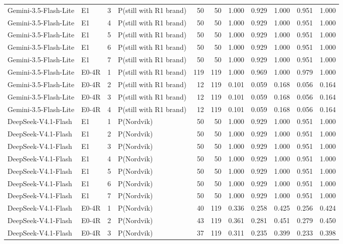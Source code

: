\begin{table}[htbp]
\begin{tabular}{llrlrrrrrrr}
Gemini-3.5-Flash-Lite & E1 & 3 & P(still with R1 brand) & 50 & 50 & 1.000 & 0.929 & 1.000 & 0.951 & 1.000 \\
Gemini-3.5-Flash-Lite & E1 & 4 & P(still with R1 brand) & 50 & 50 & 1.000 & 0.929 & 1.000 & 0.951 & 1.000 \\
Gemini-3.5-Flash-Lite & E1 & 5 & P(still with R1 brand) & 50 & 50 & 1.000 & 0.929 & 1.000 & 0.951 & 1.000 \\
Gemini-3.5-Flash-Lite & E1 & 6 & P(still with R1 brand) & 50 & 50 & 1.000 & 0.929 & 1.000 & 0.951 & 1.000 \\
Gemini-3.5-Flash-Lite & E1 & 7 & P(still with R1 brand) & 50 & 50 & 1.000 & 0.929 & 1.000 & 0.951 & 1.000 \\
Gemini-3.5-Flash-Lite & E0-4R & 1 & P(still with R1 brand) & 119 & 119 & 1.000 & 0.969 & 1.000 & 0.979 & 1.000 \\
Gemini-3.5-Flash-Lite & E0-4R & 2 & P(still with R1 brand) & 12 & 119 & 0.101 & 0.059 & 0.168 & 0.056 & 0.164 \\
Gemini-3.5-Flash-Lite & E0-4R & 3 & P(still with R1 brand) & 12 & 119 & 0.101 & 0.059 & 0.168 & 0.056 & 0.164 \\
Gemini-3.5-Flash-Lite & E0-4R & 4 & P(still with R1 brand) & 12 & 119 & 0.101 & 0.059 & 0.168 & 0.056 & 0.164 \\
DeepSeek-V4.1-Flash & E1 & 1 & P(Nordvik) & 50 & 50 & 1.000 & 0.929 & 1.000 & 0.951 & 1.000 \\
DeepSeek-V4.1-Flash & E1 & 2 & P(Nordvik) & 50 & 50 & 1.000 & 0.929 & 1.000 & 0.951 & 1.000 \\
DeepSeek-V4.1-Flash & E1 & 3 & P(Nordvik) & 50 & 50 & 1.000 & 0.929 & 1.000 & 0.951 & 1.000 \\
DeepSeek-V4.1-Flash & E1 & 4 & P(Nordvik) & 50 & 50 & 1.000 & 0.929 & 1.000 & 0.951 & 1.000 \\
DeepSeek-V4.1-Flash & E1 & 5 & P(Nordvik) & 50 & 50 & 1.000 & 0.929 & 1.000 & 0.951 & 1.000 \\
DeepSeek-V4.1-Flash & E1 & 6 & P(Nordvik) & 50 & 50 & 1.000 & 0.929 & 1.000 & 0.951 & 1.000 \\
DeepSeek-V4.1-Flash & E1 & 7 & P(Nordvik) & 50 & 50 & 1.000 & 0.929 & 1.000 & 0.951 & 1.000 \\
DeepSeek-V4.1-Flash & E0-4R & 1 & P(Nordvik) & 40 & 119 & 0.336 & 0.258 & 0.425 & 0.256 & 0.424 \\
DeepSeek-V4.1-Flash & E0-4R & 2 & P(Nordvik) & 43 & 119 & 0.361 & 0.281 & 0.451 & 0.279 & 0.450 \\
DeepSeek-V4.1-Flash & E0-4R & 3 & P(Nordvik) & 37 & 119 & 0.311 & 0.235 & 0.399 & 0.233 & 0.398 \\

\end{tabular}
\end{table}
